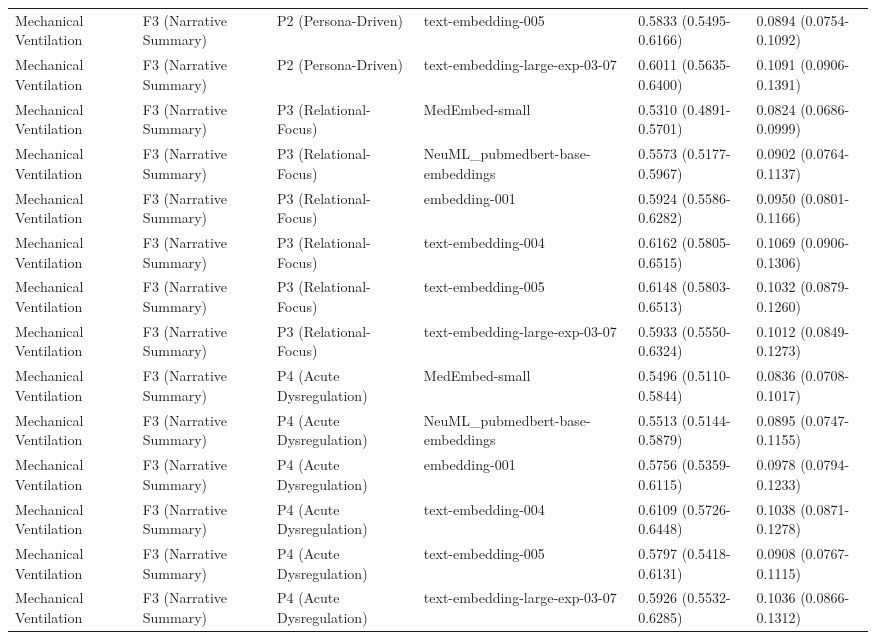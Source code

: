 \begin{tabular}{llllll}
Mechanical Ventilation & F3 (Narrative Summary) & P2 (Persona-Driven) & text-embedding-005 & 0.5833 (0.5495-0.6166) & 0.0894 (0.0754-0.1092) \\
Mechanical Ventilation & F3 (Narrative Summary) & P2 (Persona-Driven) & text-embedding-large-exp-03-07 & 0.6011 (0.5635-0.6400) & 0.1091 (0.0906-0.1391) \\
Mechanical Ventilation & F3 (Narrative Summary) & P3 (Relational-Focus) & MedEmbed-small & 0.5310 (0.4891-0.5701) & 0.0824 (0.0686-0.0999) \\
Mechanical Ventilation & F3 (Narrative Summary) & P3 (Relational-Focus) & NeuML\_pubmedbert-base-embeddings & 0.5573 (0.5177-0.5967) & 0.0902 (0.0764-0.1137) \\
Mechanical Ventilation & F3 (Narrative Summary) & P3 (Relational-Focus) & embedding-001 & 0.5924 (0.5586-0.6282) & 0.0950 (0.0801-0.1166) \\
Mechanical Ventilation & F3 (Narrative Summary) & P3 (Relational-Focus) & text-embedding-004 & 0.6162 (0.5805-0.6515) & 0.1069 (0.0906-0.1306) \\
Mechanical Ventilation & F3 (Narrative Summary) & P3 (Relational-Focus) & text-embedding-005 & 0.6148 (0.5803-0.6513) & 0.1032 (0.0879-0.1260) \\
Mechanical Ventilation & F3 (Narrative Summary) & P3 (Relational-Focus) & text-embedding-large-exp-03-07 & 0.5933 (0.5550-0.6324) & 0.1012 (0.0849-0.1273) \\
Mechanical Ventilation & F3 (Narrative Summary) & P4 (Acute Dysregulation) & MedEmbed-small & 0.5496 (0.5110-0.5844) & 0.0836 (0.0708-0.1017) \\
Mechanical Ventilation & F3 (Narrative Summary) & P4 (Acute Dysregulation) & NeuML\_pubmedbert-base-embeddings & 0.5513 (0.5144-0.5879) & 0.0895 (0.0747-0.1155) \\
Mechanical Ventilation & F3 (Narrative Summary) & P4 (Acute Dysregulation) & embedding-001 & 0.5756 (0.5359-0.6115) & 0.0978 (0.0794-0.1233) \\
Mechanical Ventilation & F3 (Narrative Summary) & P4 (Acute Dysregulation) & text-embedding-004 & 0.6109 (0.5726-0.6448) & 0.1038 (0.0871-0.1278) \\
Mechanical Ventilation & F3 (Narrative Summary) & P4 (Acute Dysregulation) & text-embedding-005 & 0.5797 (0.5418-0.6131) & 0.0908 (0.0767-0.1115) \\
Mechanical Ventilation & F3 (Narrative Summary) & P4 (Acute Dysregulation) & text-embedding-large-exp-03-07 & 0.5926 (0.5532-0.6285) & 0.1036 (0.0866-0.1312) \\

\end{tabular}
